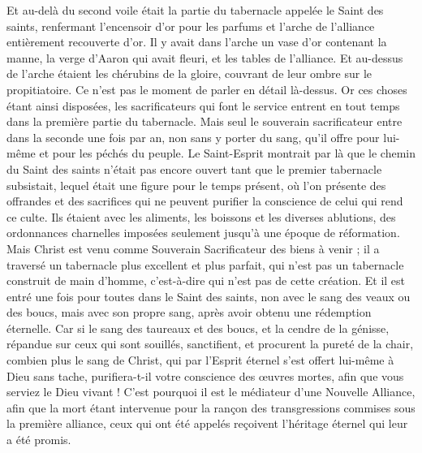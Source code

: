 \begin{multicols}{2}
Et au-delà du second voile était la partie du tabernacle appelée le Saint des saints,
renfermant l’encensoir d'or pour les parfums et l'arche de l'alliance entièrement recouverte d'or. Il y avait dans l’arche un vase d'or contenant la manne, la verge d'Aaron qui avait fleuri, et les tables de l'alliance.
Et au-dessus de l'arche étaient les chérubins de la gloire, couvrant de leur ombre sur le propitiatoire. Ce n’est pas le moment de parler en détail là-dessus.
Or ces choses étant ainsi disposées, les sacrificateurs qui font le service entrent en tout temps dans la première partie du tabernacle.
Mais seul le souverain sacrificateur entre dans la seconde une fois par an, non sans y porter du sang, qu’il offre pour lui-même et pour les péchés du peuple.
Le Saint-Esprit montrait par là que le chemin du Saint des saints n'était pas encore ouvert tant que le premier tabernacle subsistait,
lequel était une figure pour le temps présent, où l’on présente des offrandes et des sacrifices qui ne peuvent purifier la conscience de celui qui rend ce culte.
Ils étaient avec les aliments, les boissons et les diverses ablutions, des ordonnances charnelles imposées seulement jusqu’à une époque de réformation.
Mais Christ est venu comme Souverain Sacrificateur des biens à venir ; il a traversé un tabernacle plus excellent et plus parfait, qui n'est pas un tabernacle construit de main d’homme, c'est-à-dire qui n’est pas de cette création.
Et il est entré une fois pour toutes dans le Saint des saints, non avec le sang des veaux ou des boucs, mais avec son propre sang, après avoir obtenu une rédemption éternelle.
Car si le sang des taureaux et des boucs, et la cendre de la génisse, répandue sur ceux qui sont souillés, sanctifient, et procurent la pureté de la chair,
combien plus le sang de Christ, qui par l'Esprit éternel s'est offert lui-même à Dieu sans tache, purifiera-t-il votre conscience des œuvres mortes, afin que vous serviez le Dieu vivant !
C'est pourquoi il est le médiateur d’une Nouvelle Alliance, afin que la mort étant intervenue pour la rançon des transgressions commises sous la première alliance, ceux qui ont été appelés reçoivent l’héritage éternel qui leur a été promis.

\end{multicols}
